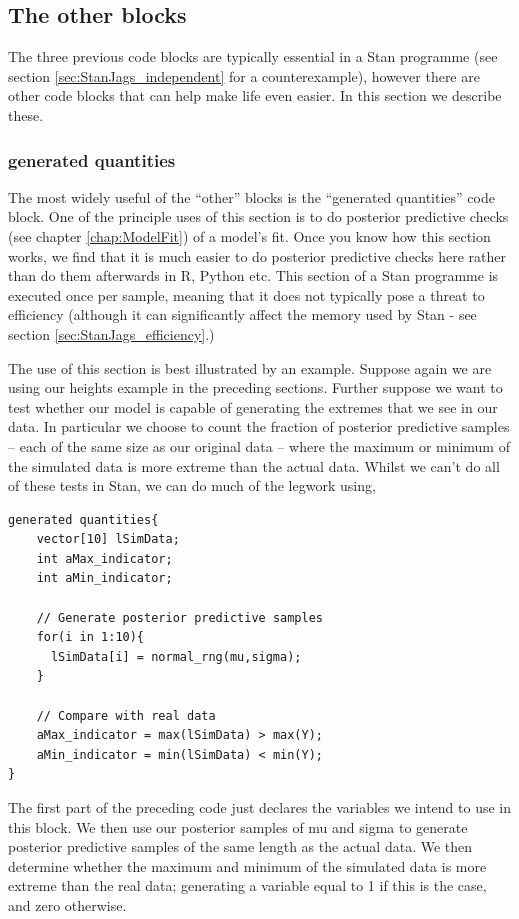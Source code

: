 \documentclass[11pt,fullpage]{book}
\begin{document}
\subsection{The other blocks}
The three previous code blocks are typically essential in a Stan programme (see section \ref{sec:StanJags_independent} for a counterexample), however there are other code blocks that can help make life even easier. In this section we describe these.

\subsubsection{generated quantities}
The most widely useful of the ``other'' blocks is the ``generated quantities'' code block. One of the principle uses of this section is to do posterior predictive checks (see chapter \ref{chap:ModelFit}) of a model's fit. Once you know how this section works, we find that it is much easier to do posterior predictive checks here rather than do them afterwards in R, Python etc. This section of a Stan programme is executed once per sample, meaning that it does not typically pose a threat to efficiency (although it can significantly affect the memory used by Stan - see section \ref{sec:StanJags_efficiency}.)

The use of this section is best illustrated by an example. Suppose again we are using our heights example in the preceding sections. Further suppose we want to test whether our model is capable of generating the extremes that we see in our data. In particular we choose to count the fraction of posterior predictive samples -- each of the same size as our original data -- where the maximum or minimum of the simulated data is more extreme than the actual data. Whilst we can't do all of these tests in Stan, we can do much of the legwork using,

\begin{verbatim}
generated quantities{
    vector[10] lSimData;
    int aMax_indicator;
    int aMin_indicator;
      
    // Generate posterior predictive samples
    for(i in 1:10){
      lSimData[i] = normal_rng(mu,sigma);
    }
     
    // Compare with real data 
    aMax_indicator = max(lSimData) > max(Y);
    aMin_indicator = min(lSimData) < min(Y);
}
\end{verbatim}

The first part of the preceding code just declares the variables we intend to use in this block. We then use our posterior samples of mu and sigma to generate posterior predictive samples of the same length as the actual data. We then determine whether the maximum and minimum of the simulated data is more extreme than the real data; generating a variable equal to 1 if this is the case, and zero otherwise.
\end{document}
